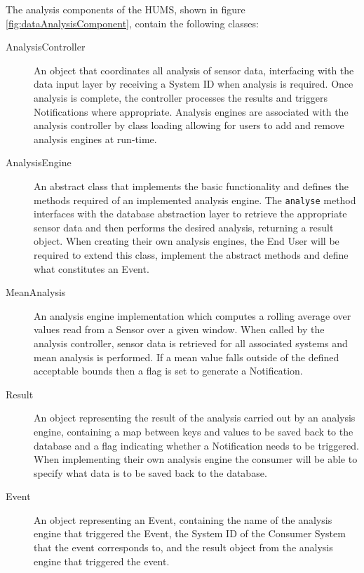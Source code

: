 \documentclass[10pt,a4paper]{article}
\begin{document}
The analysis components of the HUMS, shown in figure
\ref{fig:dataAnalysisComponent}, contain the following classes:

\begin{description}
  \item [AnalysisController] An object that coordinates all analysis of
    sensor data, interfacing with the data input layer by
    receiving a System ID when analysis is required. Once analysis is
    complete, the controller processes the results and triggers
    Notifications where appropriate. Analysis engines are associated
    with the analysis controller by class loading allowing for users to
    add and remove analysis engines at run-time.

  \item [AnalysisEngine] An abstract class that implements the basic
    functionality and defines the methods required of an implemented
    analysis engine. The \texttt{analyse} method interfaces with the database
    abstraction layer to retrieve the appropriate sensor data and then
    performs the desired analysis, returning a result object. When creating 
    their own analysis engines, the End User will be required to extend 
    this class, implement the abstract methods and define what 
    constitutes an Event.

  \item [MeanAnalysis] An analysis engine implementation which 
    computes a rolling average over values read from a Sensor over
    a given window. When called by the analysis controller, sensor 
    data is retrieved for all associated systems and mean analysis 
    is performed. If a mean value falls outside of the defined acceptable 
    bounds then a flag is set to generate a Notification.

  \item [Result] An object representing the result of the analysis
    carried out by an analysis engine, containing a
    map between keys and values to be saved back to the database 
    and a flag indicating whether a Notification needs to be triggered.
    When implementing their own analysis engine the consumer will 
    be able to specify what data is to be saved back to the database.

  \item [Event] An object representing an Event,
    containing the name of the analysis engine that triggered the
    Event, the System ID of the Consumer System that the event corresponds
    to, and the result object from the analysis engine that triggered
    the event.
\end{description}
\end{document}
